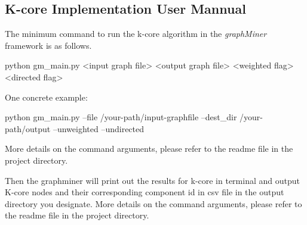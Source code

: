 \subsection{K-core Implementation User Mannual}

The minimum command to run the k-core algorithm in the {\em graphMiner} framework is as follows. 

python gm\_main.py <input graph file> <output graph file> <weighted flag> <directed flag>

One concrete example: 

python gm\_main.py --file /your-path/input-graphfile --dest\_dir /your-path/output --unweighted --undirected

More details on the command arguments, please refer to the readme file in the project directory.

Then the graphminer will print out the results for k-core in terminal and output K-core nodes and their corresponding component id in csv file in the output directory you designate.
More details on the command arguments, please refer to the readme file in the project directory.


